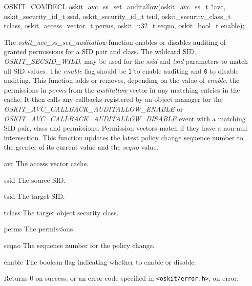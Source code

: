 \begin{apisyn}

	\funcproto OSKIT_COMDECL
	oskit_avc_ss_set_auditallow(oskit_avc_ss_t *avc, 
		         oskit_security_id_t ssid,
			 oskit_security_id_t tsid,
                         oskit_security_class_t tclass,
			 oskit_access_vector_t perms,
			 oskit_u32_t seqno,
			 oskit_bool_t enable);
\end{apisyn}
\begin{apidesc}

The \emph{oskit\_avc\_ss\_set\_auditallow} function enables or disables
auditing of granted permissions for a SID pair and class.  The
wildcard SID, \emph{OSKIT\_SECSID\_WILD}, may be used for the \emph{ssid} and
\emph{tsid} parameters to match all SID values.  The \emph{enable} 
flag should be \texttt{1} to enable auditing and \texttt{0} to disable
auditing.  This function adds or removes, depending on the value of
\emph{enable}, the permissions in \emph{perms} from the
\emph{auditallow} vector in any matching entries in the cache.  It
then calls any callbacks registered by an object manager for the
\emph{OSKIT\_AVC\_CALLBACK\_AUDITALLOW\_ENABLE} or
\emph{OSKIT\_AVC\_CALLBACK\_AUDITALLOW\_DISABLE} event with a matching SID
pair, class and permissions.  Permission vectors match if they have a
non-null intersection.  This function updates the latest policy change
sequence number to the greater of its current value and the
\emph{seqno} value.

\end{apidesc}
\begin{apiparm}
	\item[avc]
		The access vector cache.
	\item[ssid]
		The source SID.
	\item[tsid]
		The target SID.
	\item[tclass]
		The target object security class.
	\item[perms]
		The permissions.
	\item[seqno]
		The sequence number for the policy change. 
	\item[enable]
		The boolean flag indicating whether to enable or disable.
\end{apiparm}
\begin{apiret}
	Returns 0 on success, or an error code specified in
	{\tt <oskit/error.h>}, on error.
\end{apiret}


